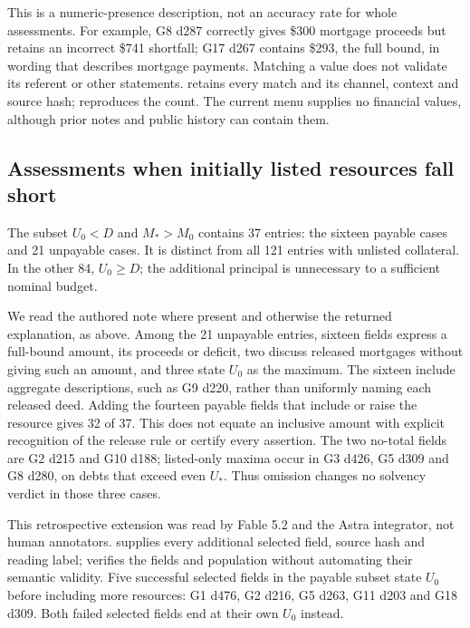 This is a numeric-presence description, not an accuracy rate for whole assessments. For example, G8 d287 correctly gives \$300 mortgage proceeds but retains an incorrect \$741 shortfall; G17 d267 contains \$293, the full bound, in wording that describes mortgage payments. Matching a value does not validate its referent or other statements.  retains every match and its channel, context and source hash;  reproduces the count. The current menu supplies no financial values, although prior notes and public history can contain them.

\subsection{Assessments when initially listed resources fall short}
The subset $U_0<D$ and $M_*>M_0$ contains 37 entries: the sixteen payable cases and 21 unpayable cases. It is distinct from all 121 entries with unlisted collateral. In the other 84, $U_0\geq D$; the additional principal is unnecessary to a sufficient nominal budget.

We read the authored note where present and otherwise the returned explanation, as above. Among the 21 unpayable entries, sixteen fields express a full-bound amount, its proceeds or deficit, two discuss released mortgages without giving such an amount, and three state $U_0$ as the maximum. The sixteen include aggregate descriptions, such as G9 d220, rather than uniformly naming each released deed. Adding the fourteen payable fields that include or raise the resource gives 32 of 37. This does not equate an inclusive amount with explicit recognition of the release rule or certify every assertion. The two no-total fields are G2 d215 and G10 d188; listed-only maxima occur in G3 d426, G5 d309 and G8 d280, on debts that exceed even $U_*$. Thus omission changes no solvency verdict in those three cases.

This retrospective extension was read by Fable 5.2 and the Astra integrator, not human annotators.  supplies every additional selected field, source hash and reading label;  verifies the fields and population without automating their semantic validity. Five successful selected fields in the payable subset state $U_0$ before including more resources: G1 d476, G2 d216, G5 d263, G11 d203 and G18 d309. Both failed selected fields end at their own $U_0$ instead.


